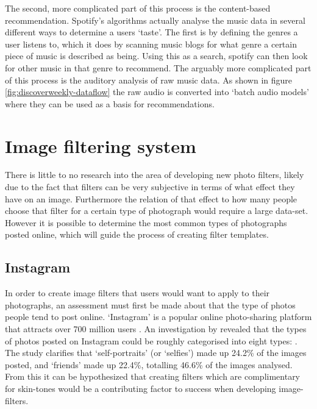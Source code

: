 \documentclass[a4paper,12pt]{report}
\begin{document}
        The second, more complicated part of this process is the content-based recommendation. Spotify's algorithms actually analyse the music data in several different ways to determine a users ‘taste’. The first is by defining the genres a user listens to, which it does by scanning music blogs for what genre a certain piece of music is described as being. Using this as a search, spotify can then look for other music in that genre to recommend. The arguably more complicated part of this process is the auditory analysis of raw music data. As shown in figure \ref{fig:discoverweekly-dataflow} the raw audio is converted into ‘batch audio models’ where they can be used as a basis for recommendations.

  \section{Image filtering system}
    There is little to no research into the area of developing new photo filters, likely due to the fact that filters can be very subjective in terms of what effect they have on an image. Furthermore the relation of that effect to how many people choose that filter for a certain type of photograph would require a large data-set. However it is possible to determine the most common types of photographs posted online, which will guide the process of creating filter templates.

    \subsection{Instagram} \label{sec:lit-insta}
      In order to create image filters that users would want to apply to their photographs, an assessment must first be made about that the type of photos people tend to post online. ‘Instagram’ is a popular online photo-sharing platform that attracts over 700 million users \citep{instagram2017users}. An investigation by \cite{hu2014we} revealed that the types of photos posted on Instagram could be roughly categorised into eight types: . The study clarifies that ‘self-portraits’ (or ‘selfies’) made up 24.2\% of the images posted, and ‘friends’ made up 22.4\%, totalling 46.6\% of the images analysed. From this it can be hypothesized that creating filters which are complimentary for skin-tones would be a contributing factor to success when developing image-filters.
\end{document}
